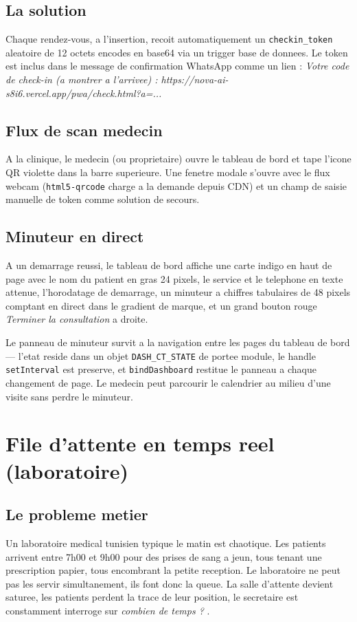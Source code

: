 \subsection{La solution}
Chaque rendez-vous, a l'insertion, recoit automatiquement un
\texttt{checkin\_token} aleatoire de 12 octets encodes en base64 via
un trigger base de donnees. Le token est inclus dans le message de
confirmation WhatsApp comme un lien :
\emph{\og Votre code de check-in (a montrer a l'arrivee) :
https://nova-ai-s8i6.vercel.app/pwa/check.html?a=... \fg{}}

\subsection{Flux de scan medecin}
A la clinique, le medecin (ou proprietaire) ouvre le tableau de bord
et tape l'icone QR violette dans la barre superieure. Une fenetre
modale s'ouvre avec le flux webcam (\texttt{html5-qrcode} charge a la
demande depuis CDN) et un champ de saisie manuelle de token comme
solution de secours.

\subsection{Minuteur en direct}
A un demarrage reussi, le tableau de bord affiche une carte indigo
en haut de page avec le nom du patient en gras 24 pixels, le service
et le telephone en texte attenue, l'horodatage de demarrage, un
minuteur a chiffres tabulaires de 48 pixels comptant en direct dans
le gradient de marque, et un grand bouton rouge \emph{Terminer la
consultation} a droite.

Le panneau de minuteur survit a la navigation entre les pages du
tableau de bord --- l'etat reside dans un objet
\texttt{DASH\_CT\_STATE} de portee module, le handle
\texttt{setInterval} est preserve, et \texttt{bindDashboard} restitue
le panneau a chaque changement de page. Le medecin peut parcourir le
calendrier au milieu d'une visite sans perdre le minuteur.

\section{File d'attente en temps reel (laboratoire)}

\subsection{Le probleme metier}
Un laboratoire medical tunisien typique le matin est chaotique. Les
patients arrivent entre 7h00 et 9h00 pour des prises de sang a jeun,
tous tenant une prescription papier, tous encombrant la petite
reception. Le laboratoire ne peut pas les servir simultanement, ils
font donc la queue. La salle d'attente devient saturee, les patients
perdent la trace de leur position, le secretaire est constamment
interroge sur \emph{\og combien de temps ? \fg{}}.

